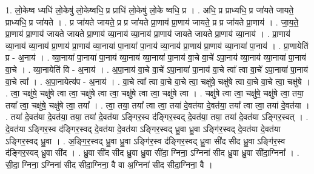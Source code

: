 \documentclass[17pt]{extarticle}
\begin{document}
1. लो॒केष्व ध्यधि॑ लो॒केषु॑ लो॒केष्वधि॒ प्र प्राधि॑ लो॒केषु॑ लो॒के ष्वधि॒ प्र । . अधि॒ प्र प्राध्यधि॒ प्र जा॑यते जायते॒ प्राध्यधि॒ प्र जा॑यते । . प्र जा॑यते जायते॒ प्र प्र जा॑यते प्रा॒णाय॑ प्रा॒णाय॑ जायते॒ प्र प्र जा॑यते प्रा॒णाय॑ । . जा॒य॒ते॒ प्रा॒णाय॑ प्रा॒णाय॑ जायते जायते प्रा॒णाय॑ व्या॒नाय॑ व्या॒नाय॑ प्रा॒णाय॑ जायते जायते प्रा॒णाय॑ व्या॒नाय॑ । . प्रा॒णाय॑ व्या॒नाय॑ व्या॒नाय॑ प्रा॒णाय॑ प्रा॒णाय॑ व्या॒नाया॑ पा॒नाया॑ पा॒नाय॑ व्या॒नाय॑ प्रा॒णाय॑ प्रा॒णाय॑ व्या॒नाया॑ पा॒नाय॑ । . प्रा॒णायेति॑ प्र - अ॒नाय॑ । . व्या॒नाया॑ पा॒नाया॑ पा॒नाय॑ व्या॒नाय॑ व्या॒नाया॑ पा॒नाय॑ वा॒चे वा॒चे॑ ऽपा॒नाय॑ व्या॒नाय॑ व्या॒नाया॑ पा॒नाय॑ वा॒चे । . व्या॒नायेति॑ वि - अ॒नाय॑ । . अ॒पा॒नाय॑ वा॒चे वा॒चे॑ ऽपा॒नाया॑ पा॒नाय॑ वा॒चे त्वा᳚ त्वा वा॒चे॑ ऽपा॒नाया॑ पा॒नाय॑ वा॒चे त्वा᳚ । . अ॒पा॒नायेत्य॑प - अ॒नाय॑ । . वा॒चे त्वा᳚ त्वा वा॒चे वा॒चे त्वा॒ चक्षु॑षे॒ चक्षु॑षे त्वा वा॒चे वा॒चे त्वा॒ चक्षु॑षे । . त्वा॒ चक्षु॑षे॒ चक्षु॑षे त्वा त्वा॒ चक्षु॑षे त्वा त्वा॒ चक्षु॑षे त्वा त्वा॒ चक्षु॑षे त्वा । . चक्षु॑षे त्वा त्वा॒ चक्षु॑षे॒ चक्षु॑षे त्वा॒ तया॒ तया᳚ त्वा॒ चक्षु॑षे॒ चक्षु॑षे त्वा॒ तया᳚ । . त्वा॒ तया॒ तया᳚ त्वा त्वा॒ तया॑ दे॒वत॑या दे॒वत॑या॒ तया᳚ त्वा त्वा॒ तया॑ दे॒वत॑या । . तया॑ दे॒वत॑या दे॒वत॑या॒ तया॒ तया॑ दे॒वत॑या ऽङ्गिर॒स्व द॑ङ्गिर॒स्वद् दे॒वत॑या॒ तया॒ तया॑ दे॒वत॑या ऽङ्गिर॒स्वत् । . दे॒वत॑या ऽङ्गिर॒स्व द॑ङ्गिर॒स्वद् दे॒वत॑या दे॒वत॑या ऽङ्गिर॒स्वद् ध्रु॒वा ध्रु॒वा ऽङ्गि॑र॒स्वद् दे॒वत॑या दे॒वत॑या ऽङ्गिर॒स्वद् ध्रु॒वा । . अ॒ङ्गि॒र॒स्वद् ध्रु॒वा ध्रु॒वा ऽङ्गि॑र॒स्व द॑ङ्गिर॒स्वद् ध्रु॒वा सी॑द सीद ध्रु॒वा ऽङ्गि॑र॒स्व द॑ङ्गिर॒स्वद् ध्रु॒वा सी॑द । . ध्रु॒वा सी॑द सीद ध्रु॒वा ध्रु॒वा सी॑दा॒ ग्निना॒ ऽग्निना॑ सीद ध्रु॒वा ध्रु॒वा सी॑दा॒ग्निना᳚ । . सी॒दा॒ ग्निना॒ ऽग्निना॑ सीद सीदा॒ग्निना॒ वै वा अ॒ग्निना॑ सीद सीदा॒ग्निना॒ वै । \newline
\end{document}
